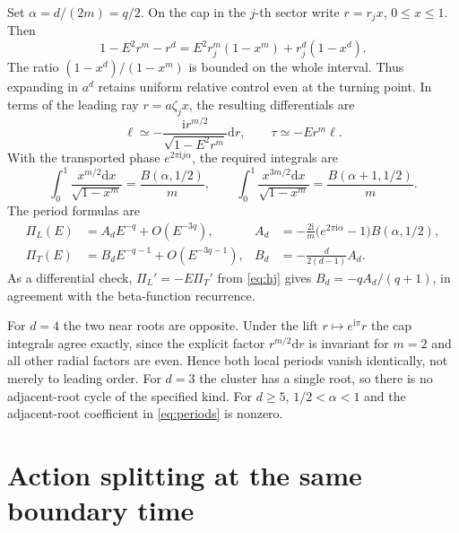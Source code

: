 \documentclass[11pt,a4paper]{article}
\newcommand{\dd}{\mathrm{d}}
\newcommand{\ii}{\mathrm{i}}
\begin{document}
Set \(\alpha=d/(2m)=q/2\). On the cap in the \(j\)-th sector write \(r=r_j x\), \(0\leq x\leq1\). Then
\begin{equation}
 1-E^2r^m-r^d=
 E^2 r_j^m(1-x^m)+r_j^d(1-x^d).
 \label{eq:root-factor}
\end{equation}
The ratio \((1-x^d)/(1-x^m)\) is bounded on the whole interval. Thus expanding in \(a^d\) retains uniform relative control even at the turning point. In terms of the leading ray \(r=a\zeta_j x\), the resulting differentials are
\begin{equation}
 \ell\simeq-\frac{\ii r^{m/2}}{\sqrt{1-E^2r^m}}\dd r,
 \qquad \tau\simeq-E r^m\ell .
\end{equation}
With the transported phase \(e^{2\pi\ii j\alpha}\), the required integrals are
\begin{equation}
 \int_0^1\frac{x^{m/2}\dd x}{\sqrt{1-x^m}}=\frac{B(\alpha,1/2)}m,
 \qquad
 \int_0^1\frac{x^{3m/2}\dd x}{\sqrt{1-x^m}}
   =\frac{B(\alpha+1,1/2)}m .
\end{equation}
The period formulas are
\begin{align}
 \Pi_L(E)&=A_d E^{-q}+O(E^{-3q}),&
 A_d&=-\frac{2\ii}{m}
    \big(e^{2\pi\ii\alpha}-1\big) B(\alpha,1/2),\\
 \Pi_T(E)&=B_d E^{-q-1}+O(E^{-3q-1}),&
 B_d&=-\frac{d}{2(d-1)}A_d .
 \label{eq:periods}
\end{align}
As a differential check, \(\Pi_L'=-E\Pi_T'\) from \eqref{eq:hj} gives \(B_d=-q A_d/(q+1)\), in agreement with the beta-function recurrence.

For \(d=4\) the two near roots are opposite. Under the lift \(r\mapsto e^{\ii\pi}r\) the cap integrals agree exactly, since the explicit factor \(r^{m/2}\dd r\) is invariant for \(m=2\) and all other radial factors are even. Hence both local periods vanish identically, not merely to leading order. For \(d=3\) the cluster has a single root, so there is no adjacent-root cycle of the specified kind. For \(d\geq5\), \(1/2<\alpha<1\) and the adjacent-root coefficient in \eqref{eq:periods} is nonzero.

\section{Action splitting at the same boundary time}
\label{sec:fixedtime}
\end{document}
